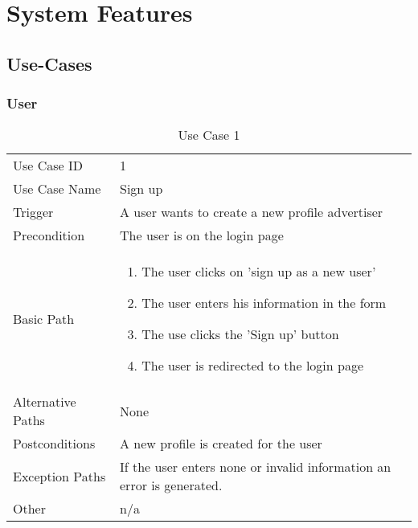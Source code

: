 \section{System Features}
\subsection{Use-Cases}
\subsubsection{User}

\begin{table}[H]
\centering
\label{table-use-case-1}
\begin{tabular}{|p{3cm}|p{10cm}}
Use Case ID       & 1                                                           
\\
Use Case Name     & Sign up                                                         
\\
Trigger           & A user wants to create a new profile
advertiser
\\
Precondition      & The user is on the login page                                                
\\
Basic Path        & \begin{enumerate}
\item The user clicks on 'sign up as a new user'
\item The user enters his information in the form
\item The use clicks the 'Sign up' button
\item The user is redirected to the login page
\end{enumerate} 
     \\
Alternative Paths & None                     
\\
Postconditions    & A new profile is created for the user
\\
Exception Paths   & If the user enters none or invalid information an error is
generated. 
\\
Other             & n/a                                                                                                                                                                                                        
\end{tabular}
\caption{Use Case 1}
\end{table}

